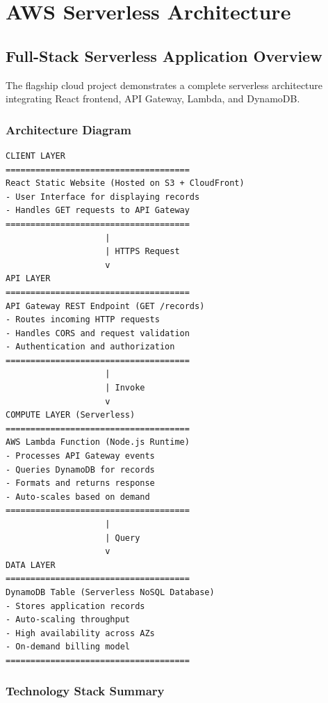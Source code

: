 
\section{AWS Serverless Architecture}

\subsection{Full-Stack Serverless Application Overview}

The flagship cloud project demonstrates a complete serverless architecture integrating React frontend, API Gateway, Lambda, and DynamoDB.

\subsubsection{Architecture Diagram}

\begin{lstlisting}[caption=Serverless Application Architecture, captionpos=b]
CLIENT LAYER
=====================================
React Static Website (Hosted on S3 + CloudFront)
- User Interface for displaying records
- Handles GET requests to API Gateway
=====================================
                    |
                    | HTTPS Request
                    v
API LAYER
=====================================
API Gateway REST Endpoint (GET /records)
- Routes incoming HTTP requests
- Handles CORS and request validation
- Authentication and authorization
=====================================
                    |
                    | Invoke
                    v
COMPUTE LAYER (Serverless)
=====================================
AWS Lambda Function (Node.js Runtime)
- Processes API Gateway events
- Queries DynamoDB for records
- Formats and returns response
- Auto-scales based on demand
=====================================
                    |
                    | Query
                    v
DATA LAYER
=====================================
DynamoDB Table (Serverless NoSQL Database)
- Stores application records
- Auto-scaling throughput
- High availability across AZs
- On-demand billing model
=====================================
\end{lstlisting}

\subsubsection{Technology Stack Summary}

